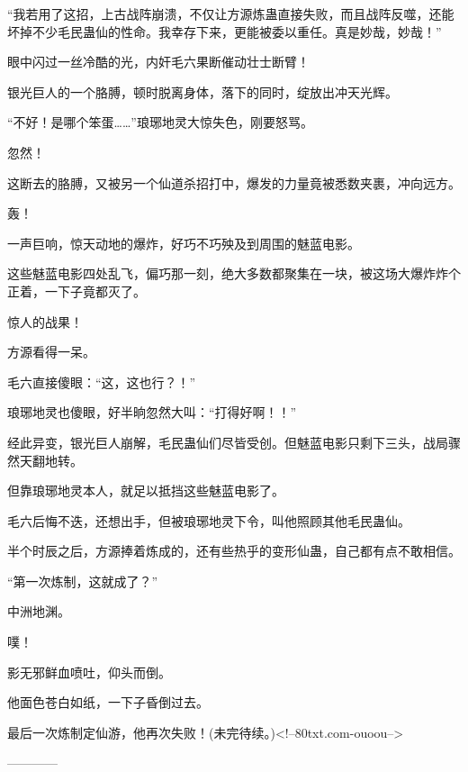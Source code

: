 \begin{this_body}
“我若用了这招，上古战阵崩溃，不仅让方源炼蛊直接失败，而且战阵反噬，还能坏掉不少毛民蛊仙的性命。我幸存下来，更能被委以重任。真是妙哉，妙哉！”

眼中闪过一丝冷酷的光，内奸毛六果断催动壮士断臂！

银光巨人的一个胳膊，顿时脱离身体，落下的同时，绽放出冲天光辉。

“不好！是哪个笨蛋……”琅琊地灵大惊失色，刚要怒骂。

忽然！

这断去的胳膊，又被另一个仙道杀招打中，爆发的力量竟被悉数夹裹，冲向远方。

轰！

一声巨响，惊天动地的爆炸，好巧不巧殃及到周围的魅蓝电影。

这些魅蓝电影四处乱飞，偏巧那一刻，绝大多数都聚集在一块，被这场大爆炸炸个正着，一下子竟都灭了。

惊人的战果！

方源看得一呆。

毛六直接傻眼：“这，这也行？！”

琅琊地灵也傻眼，好半晌忽然大叫：“打得好啊！！”

经此异变，银光巨人崩解，毛民蛊仙们尽皆受创。但魅蓝电影只剩下三头，战局骤然天翻地转。

但靠琅琊地灵本人，就足以抵挡这些魅蓝电影了。

毛六后悔不迭，还想出手，但被琅琊地灵下令，叫他照顾其他毛民蛊仙。

半个时辰之后，方源捧着炼成的，还有些热乎的变形仙蛊，自己都有点不敢相信。

“第一次炼制，这就成了？”

中洲地渊。

噗！

影无邪鲜血喷吐，仰头而倒。

他面色苍白如纸，一下子昏倒过去。

最后一次炼制定仙游，他再次失败！(未完待续。)<!--80txt.com-ouoou-->

------------

\end{this_body}

